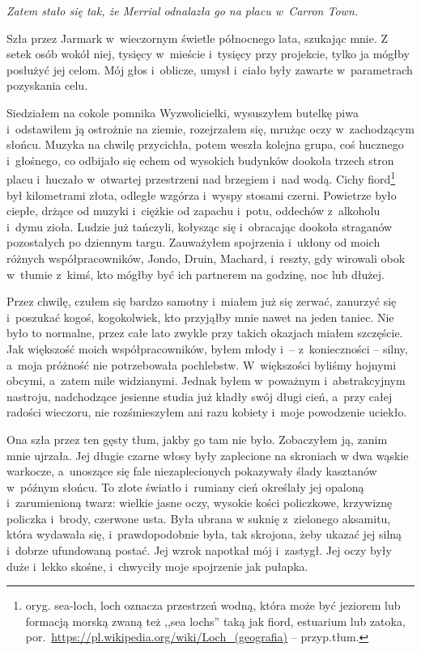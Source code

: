 \documentclass[oneside,polish,11pt,sfheadings]{mwbk}
\begin{document}
\textit{Zatem stało się tak, że Merrial odnalazła go na placu w~Carron
Town.}

Szła przez Jarmark w~wieczornym świetle północnego lata, szukając mnie.
Z setek osób wokół niej, tysięcy w~mieście i~tysięcy przy projekcie,
tylko ja mógłby posłużyć jej celom. Mój głos i~oblicze, umysł i~ciało
były zawarte w~parametrach pozyskania celu.

Siedziałem na cokole pomnika Wyzwolicielki, wysuszyłem butelkę piwa i~odstawiłem ją ostrożnie na ziemie, rozejrzałem się, mrużąc oczy w~zachodzącym słońcu. Muzyka na chwilę przycichła, potem weszła kolejna
grupa, coś hucznego i~głośnego, co odbijało się echem od wysokich
budynków dookoła trzech stron placu i~huczało w~otwartej przestrzeni nad
brzegiem i~nad wodą. Cichy fiord\footnote{oryg. sea-loch, loch oznacza
przestrzeń wodną, która może być jeziorem lub formacją morską zwaną też
,,sea lochs'' taką jak fiord, estuarium lub zatoka,
por.~\url{https://pl.wikipedia.org/wiki/Loch\_(geografia)} -- przyp.tłum.} był kilometrami złota, odległe wzgórza i~wyspy stosami
czerni. Powietrze było ciepłe, drżące od muzyki i~ciężkie od zapachu i~potu, oddechów z~alkoholu i~dymu zioła. Ludzie już tańczyli, kołysząc
się i~obracając dookoła straganów pozostałych po dziennym targu.
Zauważyłem spojrzenia i~ukłony od moich różnych współpracowników, Jondo,
Druin, Machard, i~reszty, gdy wirowali obok w~tłumie z~kimś, kto mógłby
być ich partnerem na godzinę, noc lub dłużej.

Przez chwilę, czułem się bardzo samotny i~miałem już się zerwać,
zanurzyć się i~poszukać kogoś, kogokolwiek, kto przyjąłby mnie nawet na
jeden taniec. Nie było to normalne, przez całe lato zwykle przy takich
okazjach miałem szczęście. Jak większość moich współpracowników, byłem
młody i~-- z~konieczności -- silny, a~moja próżność nie potrzebowała
pochlebstw. W~większości byliśmy hojnymi obcymi, a~zatem mile
widzianymi. Jednak byłem w~poważnym i~abstrakcyjnym nastroju,
nadchodzące jesienne studia już kładły swój długi cień, a~przy całej
radości wieczoru, nie rozśmieszyłem ani razu kobiety i~moje powodzenie
uciekło.

Ona szła przez ten gęsty tłum, jakby go tam nie było. Zobaczyłem ją,
zanim mnie ujrzała. Jej długie czarne włosy były zaplecione na skroniach
w dwa wąskie warkocze, a~unoszące się fale niezaplecionych pokazywały
ślady kasztanów w~późnym słońcu. To złote światło i~rumiany cień
określały jej opaloną i~zarumienioną twarz: wielkie jasne oczy, wysokie
kości policzkowe, krzywiznę policzka i~brody, czerwone usta. Była ubrana
w suknię z~zielonego aksamitu, która wydawała się, i~prawdopodobnie
była, tak skrojona, żeby ukazać jej silną i~dobrze ufundowaną postać.
Jej wzrok napotkał mój i~zastygł. Jej oczy były duże i~lekko skośne, i~chwyciły moje spojrzenie jak pułapka.
\end{document}
